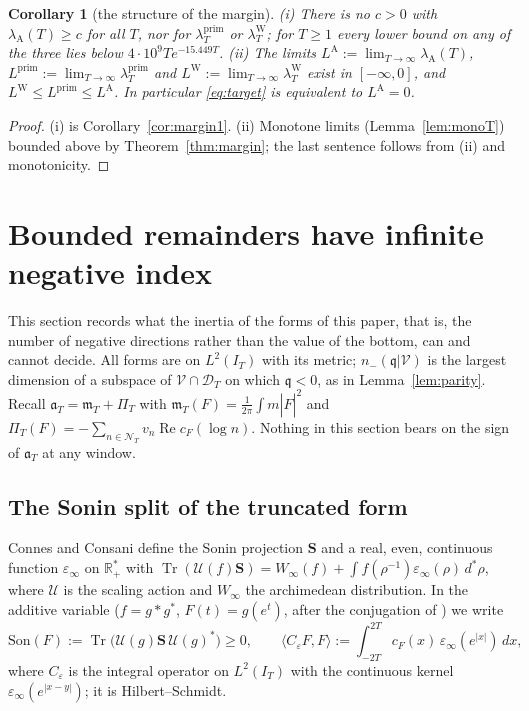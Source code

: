 \documentclass[11pt]{amsart}
\newtheorem{corollary}[theorem]{Corollary}
\theoremstyle{definition}
\theoremstyle{remark}
\newcommand{\R}{\mathbb R}
\newcommand{\Rel}{\operatorname{Re}}
\newcommand{\IT}{I_T}
\newcommand{\lamP}{\lambda^{\mathrm{prim}}_T}
\newcommand{\lamW}{\lambda^{\mathrm W}_T}
\newcommand{\lamA}{\lambda_{\mathrm A}(T)}
\newcommand{\Fh}{\widehat F}
\newcommand{\cF}{c_F}
\newcommand{\NT}{\mathcal N_T}
\newcommand{\PiT}{\Pi_T}
\newcommand{\mT}{\mathfrak m_T}
\begin{document}
\begin{corollary}[the structure of the margin]\label{cor:margin2}
\emph{(i)} There is no $c>0$ with $\lamA\ge c$ for all $T$, nor for $\lamP$ or $\lamW$; for $T\ge1$ every
lower bound on any of the three lies below $4\cdot10^9Te^{-15.449T}$.
\emph{(ii)} The limits $L^{\mathrm A}:=\lim_{T\to\infty}\lamA$, $L^{\mathrm{prim}}:=\lim_{T\to\infty}\lamP$ and
$L^{\mathrm W}:=\lim_{T\to\infty}\lamW$ exist in $[-\infty,0]$, and $L^{\mathrm W}\le L^{\mathrm{prim}}\le L^{\mathrm A}$.
In particular \eqref{eq:target} is equivalent to $L^{\mathrm A}=0$.
\end{corollary}
\begin{proof}
(i) is Corollary~\ref{cor:margin1}. (ii) Monotone limits (Lemma~\ref{lem:monoT}) bounded above by
Theorem~\ref{thm:margin}; the last sentence follows from (ii) and monotonicity.
\end{proof}

\section{Bounded remainders have infinite negative index}\label{sec:inertia}

This section records what the inertia of the forms of this paper, that is, the number of negative
directions rather than the value of the bottom, can and cannot decide. All forms are on $L^2(\IT)$ with
its metric; $n_-(\mathfrak q|\mathcal V)$ is the largest dimension of a subspace of $\mathcal V\cap\mathcal D_T$ on which
$\mathfrak q<0$, as in Lemma~\ref{lem:parity}. Recall $\mathfrak a_T=\mT+\PiT$ with $\mT(F)=\frac1{2\pi}\int m|\Fh|^2$
and $\PiT(F)=-\sum_{n\in\NT}v_n\Rel\cF(\log n)$. Nothing in this section bears on the sign of $\mathfrak a_T$ at any
window.

\subsection{The Sonin split of the truncated form}
Connes and Consani \cite[Thm.~4.7, (83)--(84)]{ConnesConsani2021} define the Sonin projection $\mathbf S$ and a
real, even, continuous function $\varepsilon_\infty$ on $\R_+^*$ with
$\operatorname{Tr}(\mathcal U(f)\mathbf S)=W_\infty(f)+\int f(\rho^{-1})\varepsilon_\infty(\rho)\,d^*\rho$, where $\mathcal U$ is the
scaling action and $W_\infty$ the archimedean distribution. In the additive variable ($f=g*g^*$, $F(t)=g(e^t)$,
after the conjugation of \cite[App.~A]{ConnesConsani2021}) we write
\[
\mathrm{Son}(F):=\operatorname{Tr}\big(\mathcal U(g)\mathbf S\,\mathcal U(g)^*\big)\ge0,\qquad
\langle C_\varepsilon F,F\rangle:=\int_{-2T}^{2T}\cF(x)\,\varepsilon_\infty(e^{|x|})\,dx ,
\]
where $C_\varepsilon$ is the integral operator on $L^2(\IT)$ with the continuous kernel $\varepsilon_\infty(e^{|x-y|})$; it
is Hilbert--Schmidt.
\end{document}
